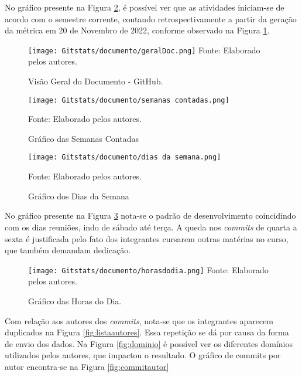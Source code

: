 \documentclass[
    12pt,               %
    openright,          %
    oneside,
    a4paper,            %
    BIBLATEX,           %
    TODO,               %
    english,            %
    brazil              %
    ]{ifsp-spo-inf-ctds}
\begin{document}
    No gráfico presente na Figura \ref{fig:semanas contadas}, é possível ver que as atividades iniciam-se de acordo com o semestre corrente, contando retrospectivamente a partir da geração da métrica em 20 de Novembro de 2022, conforme observado na Figura \ref{fig:geralDoc}.

    \begin{figure}[H]
            \centering
            \caption{Visão Geral do Documento - GitHub.}
            \texttt{[image: Gitstats/documento/geralDoc.png]}
            {\footnotesize Fonte: Elaborado pelos autores.}
            \label{fig:geralDoc}
    \end{figure}


    \begin{figure}[H]
            \centering
            \caption{Gráfico das Semanas Contadas}
            \texttt{[image: Gitstats/documento/semanas contadas.png]}
            \label{fig:semanas contadas}
            \centering
                
        \footnotesize Fonte: Elaborado pelos autores.
    \end{figure}
    
    \begin{figure}[H]
            \centering
            \caption{Gráfico dos Dias da Semana}
            \texttt{[image: Gitstats/documento/dias da semana.png]}
                
            \label{fig:diadasemana}
            \centering
            \footnotesize Fonte: Elaborado pelos autores.
    \end{figure} 

    No gráfico presente na Figura \ref{fig:diadasemana} nota-se o padrão de desenvolvimento coincidindo com os dias reuniões, indo de sábado até terça. A queda nos \emph{commits} de quarta a sexta é justificada pelo fato dos integrantes cursarem outras matérias no curso, que também demandam dedicação.
    
      \begin{figure}[H]
            \centering
            \caption{Gráfico das Horas do Dia.}
            \texttt{[image: Gitstats/documento/horasdodia.png]}
            {\footnotesize Fonte: Elaborado pelos autores.}
            \label{fig:horadodia}
        \end{figure} 

    Com relação aos autores dos \emph{commits}, nota-se que os integrantes aparecem duplicados na Figura \ref{fig:listaautores}. Essa repetição se dá por causa da forma de envio dos dados. Na Figura \ref{fig:dominio} é possível ver os diferentes domínios utilizados pelos autores, que impactou o resultado. O gráfico de commits por autor encontra-se na Figura \ref{fig:commitautor}
    
\end{document}
